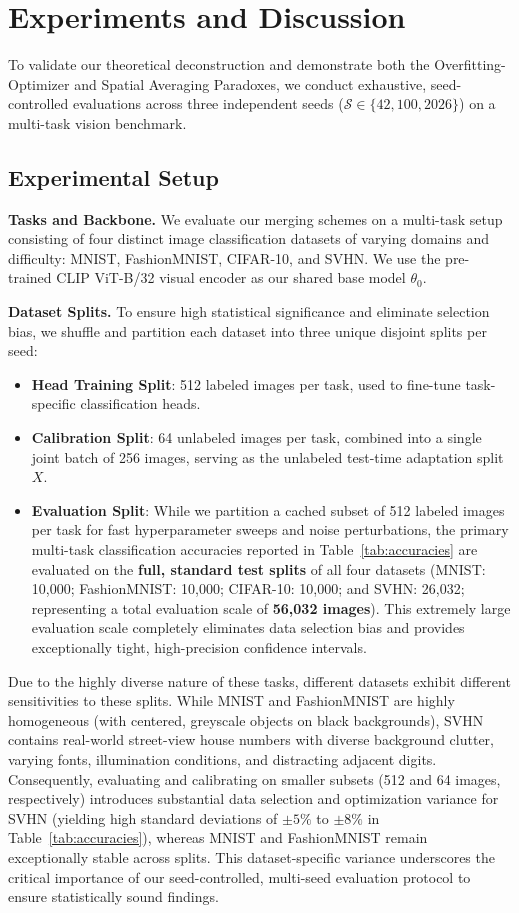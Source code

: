 \section{Experiments and Discussion}
\label{submission:experiments}

To validate our theoretical deconstruction and demonstrate both the Overfitting-Optimizer and Spatial Averaging Paradoxes, we conduct exhaustive, seed-controlled evaluations across three independent seeds ($\mathcal{S} \in \{42, 100, 2026\}$) on a multi-task vision benchmark.

\subsection{Experimental Setup}
\label{sub:setup}
\textbf{Tasks and Backbone.} We evaluate our merging schemes on a multi-task setup consisting of four distinct image classification datasets of varying domains and difficulty: MNIST, FashionMNIST, CIFAR-10, and SVHN. We use the pre-trained CLIP ViT-B/32 \cite{clip} visual encoder as our shared base model $\theta_0$. 

\textbf{Dataset Splits.} To ensure high statistical significance and eliminate selection bias, we shuffle and partition each dataset into three unique disjoint splits per seed:
\begin{itemize}
    \item \textbf{Head Training Split}: 512 labeled images per task, used to fine-tune task-specific classification heads.
    \item \textbf{Calibration Split}: 64 unlabeled images per task, combined into a single joint batch of 256 images, serving as the unlabeled test-time adaptation split $X$.
    \item \textbf{Evaluation Split}: While we partition a cached subset of 512 labeled images per task for fast hyperparameter sweeps and noise perturbations, the primary multi-task classification accuracies reported in Table~\ref{tab:accuracies} are evaluated on the \textbf{full, standard test splits} of all four datasets (MNIST: 10,000; FashionMNIST: 10,000; CIFAR-10: 10,000; and SVHN: 26,032; representing a total evaluation scale of \textbf{56,032 images}). This extremely large evaluation scale completely eliminates data selection bias and provides exceptionally tight, high-precision confidence intervals.
\end{itemize}
Due to the highly diverse nature of these tasks, different datasets exhibit different sensitivities to these splits. While MNIST and FashionMNIST are highly homogeneous (with centered, greyscale objects on black backgrounds), SVHN contains real-world street-view house numbers with diverse background clutter, varying fonts, illumination conditions, and distracting adjacent digits. Consequently, evaluating and calibrating on smaller subsets (512 and 64 images, respectively) introduces substantial data selection and optimization variance for SVHN (yielding high standard deviations of $\pm 5\%$ to $\pm 8\%$ in Table~\ref{tab:accuracies}), whereas MNIST and FashionMNIST remain exceptionally stable across splits. This dataset-specific variance underscores the critical importance of our seed-controlled, multi-seed evaluation protocol to ensure statistically sound findings.

